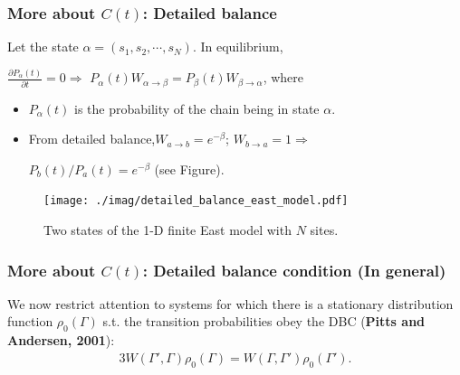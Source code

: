 \documentclass[8pt]{beamer}
\begin{document}
\begin{frame}
	\frametitle{More about  $C(t)$: Detailed balance}
	Let the state $\alpha = (s_1,s_2,\cdots,s_N)$. In equilibrium,
	
	$ \frac{\partial P_\alpha(t)}{\partial t} = 0 \Rightarrow$ $P_\alpha(t) W_{\alpha\to \beta} = P_\beta(t) W_{\beta\to \alpha}$, where
	\begin{itemize}
		\item $P_\alpha(t)$ is the probability of the chain being in state $\alpha$.
		\item From detailed balance,$W_{a\to b} = e^{-\beta}$; $W_{b\to a} = 1 \Rightarrow$ 
		
		$P_b(t)/ P_a(t) = e^{-\beta}$ (see Figure).
	\end{itemize}	
	\begin{figure}
	\centering
	\texttt{[image: ./imag/detailed\_balance\_east\_model.pdf]}
	\setlength{\abovecaptionskip}{0pt}
	\caption{Two states of the 1-D finite East model with $N$ sites. }
    \end{figure}

\end{frame}

\begin{frame}
		\frametitle{More about  $C(t)$: Detailed balance condition (In general)}
We now restrict attention to systems for which there is a stationary distribution function
$\rho_0(\Gamma)$ s.t. the transition probabilities obey the DBC (\textbf{Pitts and Andersen, 2001}):
\begin{alignat}{3}
W(\Gamma',\Gamma) \rho_0(\Gamma) =W(\Gamma,\Gamma') \rho_0(\Gamma').
\end{alignat}

\end{frame}
\end{document}
